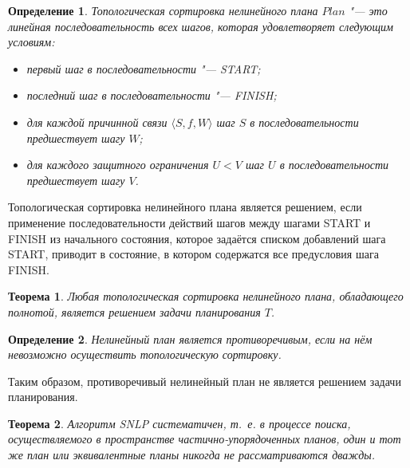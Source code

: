 \documentclass[b5paper,11pt]{book}
\newtheorem{Def}{Определение}
\newtheorem{Th}{Теорема}
\numberwithin{Def}{section}
\numberwithin{Th}{chapter}
\numberwithin{St}{chapter}
\begin{document}
	\begin{Def}
		Топологическая сортировка нелинейного плана $Plan$ "--- это линейная последовательность всех шагов, которая удовлетворяет следующим условиям:
		\begin{itemize}
			\item первый шаг в последовательности "--- START;
			\item последний шаг в последовательности "--- FINISH;
			\item для каждой причинной связи $\langle S, f, W\rangle$ шаг $S$ в последовательности предшествует шагу $W$;
			\item для каждого защитного ограничения $U<V$ шаг $U$ в последовательности предшествует шагу $V$.
		\end{itemize}
	\end{Def}

	Топологическая сортировка нелинейного плана является решением, если применение последовательности действий шагов между шагами START и FINISH из начального состояния, которое задаётся списком добавлений шага START, приводит в состояние, в котором содержатся все предусловия шага FINISH.
	
	\begin{Th} 
		Любая топологическая сортировка нелинейного плана, обладающего полнотой, является решением задачи планирования $T$.
	\end{Th}
	
	\begin{Def}
		Нелинейный план является противоречивым, если на нём невозможно осуществить топологическую сортировку.	
	\end{Def}
		 
	Таким образом, противоречивый нелинейный план не является решением задачи планирования.
	
	\begin{Th} 
		Алгоритм SNLP систематичен, т.~е. в процессе поиска, осуществляемого в пространстве частично-упорядоченных планов, один и тот же план или эквивалентные планы никогда не рассматриваются дважды.
	\end{Th}
	
\end{document}
